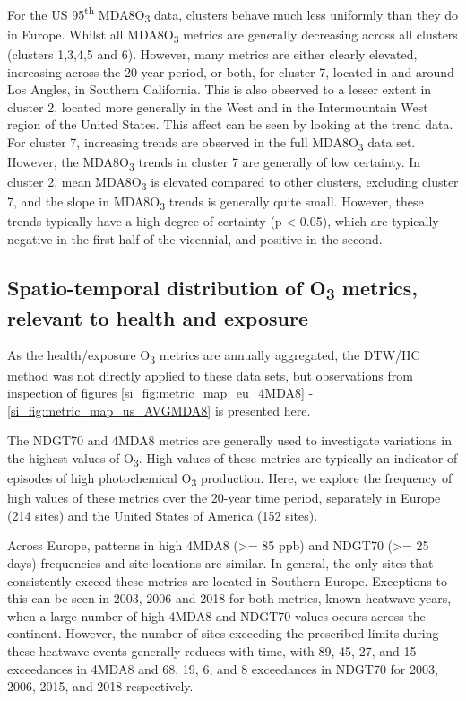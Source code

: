 \documentclass[journal abbreviation, manuscript]{copernicus}
\begin{document}
For the US 95\textsuperscript{th} MDA8O\textsubscript{3} data, clusters behave much less uniformly than they do in Europe. Whilst all MDA8O\textsubscript{3} metrics are generally decreasing across all clusters (clusters 1,3,4,5 and 6). However, many metrics are either clearly elevated, increasing across the 20-year period, or both, for cluster 7, located in and around Los Angles, in Southern California. This is also observed to a lesser extent in cluster 2, located more generally in the West and in the Intermountain West region of the United States. This affect can be seen by looking at the trend data. For cluster 7, increasing trends are observed in the full MDA8O\textsubscript{3} data set. However, the MDA8O\textsubscript{3} trends in cluster 7 are generally of low certainty. In cluster 2, mean MDA8O\textsubscript{3} is elevated compared to other clusters, excluding cluster 7, and the slope in MDA8O\textsubscript{3} trends is generally quite small. However, these trends typically have a high degree of certainty (p < 0.05), which are typically negative in the first half of the vicennial, and positive in the second. 

\subsection{Spatio-temporal distribution of O\textsubscript{3} metrics, relevant to health and exposure} \label{sect:metrics_distribution}

As the health/exposure O\textsubscript{3} metrics are annually aggregated, the DTW/HC method was not directly applied to these data sets, but observations from inspection of figures \ref{si_fig:metric_map_eu_4MDA8} - \ref{si_fig:metric_map_us_AVGMDA8} is presented here. 

The NDGT70 and 4MDA8 metrics are generally used to investigate variations in the highest values of O\textsubscript{3}. High values of these metrics are typically an indicator of episodes of high photochemical O\textsubscript{3} production. Here, we explore the frequency of high values of these metrics over the 20-year time period, separately in Europe (214 sites) and the United States of America (152 sites).

Across Europe, patterns in high 4MDA8 (>= 85 ppb) and NDGT70 (>= 25 days) frequencies and site locations are similar. In general, the only sites that consistently exceed these metrics are located in Southern Europe. Exceptions to this can be seen in 2003, 2006 and 2018 for both metrics, known heatwave years, when a large number of high 4MDA8 and NDGT70 values occurs across the continent. However, the number of sites exceeding the prescribed limits during these heatwave events generally reduces with time, with 89, 45, 27, and 15 exceedances in 4MDA8 and 68, 19, 6, and 8 exceedances in NDGT70 for 2003, 2006, 2015, and 2018 respectively.
\end{document}
